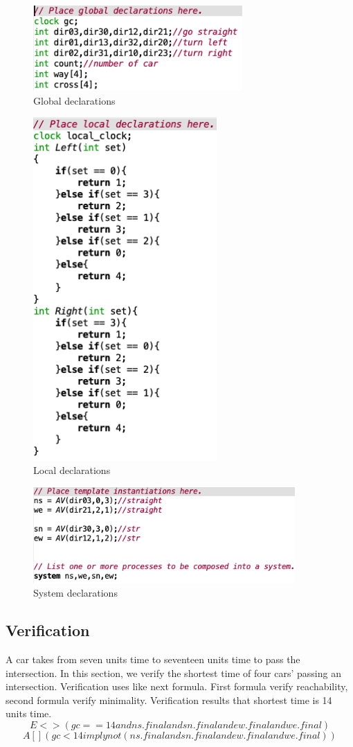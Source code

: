 \documentclass[]{article}
\begin{document}
		\begin{figure}
		\centering
		\includegraphics[width=80mm]{Global_dec.png}
		\caption{Global declarations}
		\label{GD}
		\end{figure}
		\begin{figure}
		\centering
		\includegraphics[width=70mm]{local_dec.png}
		\caption{Local declarations}
		\label{LD}
		\end{figure}
		\begin{figure}
		\centering
		\includegraphics[width=100mm]{SysD.png}
		\caption{System declarations}
		\label{SysD}
		\end{figure}
	\subsection{Verification}
		A car takes from seven units time to seventeen units time to pass the intersection. In this section, we verify the shortest time of four cars' passing an intersection.  Verification uses like next formula. First formula verify reachability, second formula verify minimality.  Verification results that shortest time is 14 units time.
		\[
		E<> (gc == 14 and ns.final and sn.final and ew.final and we.final)
		\]
		\[
		A [ ] (gc < 14 imply not (ns.final and sn.final and ew.final and we.final))
		\]
\end{document}
